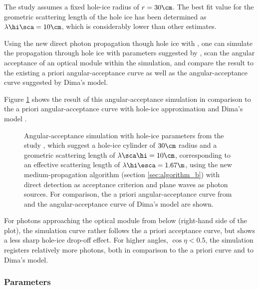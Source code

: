 The  study assumes a fixed hole-ice radius of $r=30\cm$. The best fit value for the geometric scattering length of the hole ice has been determined as $\lambda\hi\sca = 10\cm$, which is considerably lower than other estimates. \cite{martindardupdate}

Using the new direct photon propagation though hole ice with \clsim, one can simulate the propagation through hole ice with parameters suggested by , scan the angular acceptance of an optical module within the simulation, and compare the result to the existing a priori angular-acceptance curve as well as the angular-acceptance curve suggested by Dima's model.


Figure \ref{fig:eePai1sh} shows the result of this angular-acceptance simulation in comparison to the a priori angular-acceptance curve with hole-ice approximation \cite{icepaper} and Dima's model \cite{flasherdataderivedicemodels}.

\begin{figure}[htbp]
  \caption{Angular-acceptance simulation with hole-ice parameters from the  study \cite{martindardupdate}, which suggest a hole-ice cylinder of $30\cm$ radius and a geometric scattering length of $\lambda\sca\hi = 10\cm$, corresponding to an effective scattering length of $\lambda\hi\esca = 1.67\m$, using the new medium-propagation algorithm (section \ref{sec:algorithm_b}) with direct detection as acceptance criterion and plane waves as photon sources. For comparison, the a priori angular-acceptance curve from \cite{icepaper} and the angular-acceptance curve of Dima's model \cite{flasherdataderivedicemodels} are shown.}
  \label{fig:eePai1sh}
\end{figure}

For photons approaching the optical module from below (right-hand side of the plot), the simulation curve rather follows the a priori acceptance curve, but shows a less sharp hole-ice drop-off effect. For higher angles, $\cos\eta < 0.5$, the simulation registers relatively more photons, both in comparison to the a priori curve and to Dima's model.


\subsubsection{ Parameters}
\label{sec:spicehd_parameters}

